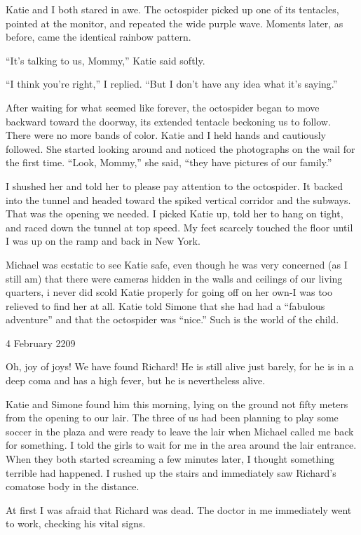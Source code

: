 \documentclass[]{article}
\begin{document}
{	Katie and I both stared in awe. The octospider picked up one of its tentacles, pointed at the monitor, and repeated the wide purple wave. Moments later, as before, came the identical rainbow pattern.
	
	“It’s talking to us, Mommy,” Katie said softly.
	
	“I think you’re right,” I replied. “But I don’t have any idea what it’s saying.”
	
	After waiting for what seemed like forever, the octospider began to move backward toward the doorway, its extended tentacle beckoning us to follow. There were no more bands of color. Katie and I held hands and cautiously followed. She started looking around and noticed the photographs on the wail for the first time. “Look, Mommy,” she said, “they have pictures of our family.”
	
	I shushed her and told her to please pay attention to the octospider. It backed into the tunnel and headed toward the spiked vertical corridor and the subways. That was the opening we needed. I picked Katie up, told her to hang on tight, and raced down the tunnel at top speed. My feet scarcely touched the floor until I was up on the ramp and back in New York.
	
	Michael was ecstatic to see Katie safe, even though he was very concerned (as I still am) that there were cameras hidden in the walls and ceilings of our living quarters, i never did scold Katie properly for going off on her own-I was too relieved to find her at all. Katie told Simone that she had had a “fabulous adventure” and that the octospider was “nice.” Such is the world of the child.
	
	4 February 2209
	
	Oh, joy of joys! We have found Richard! He is still alive just barely, for he is in a deep coma and has a high fever, but he is nevertheless alive.
	
	Katie and Simone found him this morning, lying on the ground not fifty meters from the opening to our lair. The three of us had been planning to play some soccer in the plaza and were ready to leave the lair when Michael called me back for something. I told the girls to wait for me in the area around the lair entrance. When they both started screaming a few minutes later, I thought something terrible had happened. I rushed up the stairs and immediately saw Richard’s comatose body in the distance.
	
	At first I was afraid that Richard was dead. The doctor in me immediately went to work, checking his vital signs.
	
}
\end{document}
